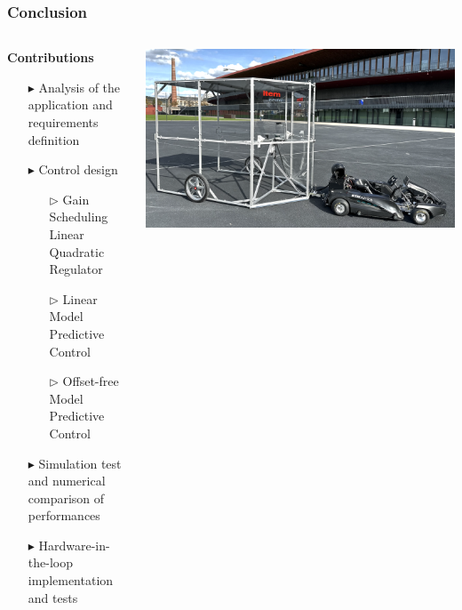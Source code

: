 \documentclass[9pt, aspectratio=169]{beamer}
\begin{document}
\begin{frame}
\frametitle{Conclusion}
\begin{columns}
\begin{column}{0.55\textwidth}
\textcolor{emph@Thesis}{\textbf{\small{Contributions}}} 
\vspace{0.2cm}
\begin{itemize}
	\footnotesize
	\item[$\blacktriangleright$] Analysis of the application and requirements definition
	\item[$\blacktriangleright$] Control design
	\begin{itemize}
		 \setlength{\itemsep}{4pt}
		\item[$\triangleright$] Gain Scheduling Linear Quadratic Regulator
		\item[$\triangleright$] Linear Model Predictive Control
		\item[$\triangleright$] Offset-free Model Predictive Control
	\end{itemize}
	\item[$\blacktriangleright$] Simulation test and numerical comparison of performances
	\item[$\blacktriangleright$] Hardware-in-the-loop implementation and tests
\end{itemize}
\end{column}

\vspace{0.3cm}
\begin{column}{0.4\textwidth}
	\begin{center}
  		\includegraphics[width=1\textwidth]{Windshield} 
	\end{center}


\end{column}
\end{columns}
\end{frame}
\end{document}
